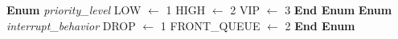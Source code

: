 \documentclass[a4paper,11pt]{article}
\begin{document}
\begin{algorithm}
\caption{Types and Enumerations}
\begin{algorithmic}[1]
\State \textbf{Enum} \textit{priority\_level}
\State \hspace{0.5cm} LOW $\leftarrow$ 1
\State \hspace{0.5cm} HIGH $\leftarrow$ 2
\State \hspace{0.5cm} VIP $\leftarrow$ 3
\State \textbf{End Enum}
\vspace{0.3cm}
\State \textbf{Enum} \textit{interrupt\_behavior}
\State \hspace{0.5cm} DROP $\leftarrow$ 1
\State \hspace{0.5cm} FRONT\_QUEUE $\leftarrow$ 2
\State \textbf{End Enum}
\end{algorithmic}
\end{algorithm}
\end{document}
